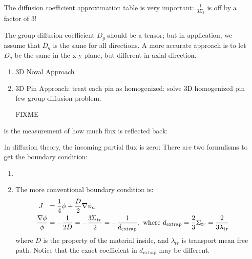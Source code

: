 \documentclass{school-22.211-notes}
\date{March 21, 2012}
\begin{document}
\maketitle

\clearpage
{}

The diffusion coefficient approximation table is very important: $\frac{1}{3\Sigma_t}$ is off by a factor of 3! 



The group diffusion coefficient $D_g$ should be a tensor; but in application, we assume that $D_g$ is the same for all directions. A more accurate approach is to let $D_g$ be the same in the x-y plane, but different in axial direction. 




\clearpage
{}
\begin{enumerate}
\item 3D Noval Approach
\item 3D Pin Approach: treat each pin as homogenized; solve 3D homogenized pin few-group diffusion problem. 
\item [FIXME]
\end{enumerate}





 is the measurement of how much flux is reflected back: 


In diffusion theory, the incoming partial flux is zero:
There are two formulisms to get the boundary condition: 
\begin{enumerate}
\item 
{}
\item The more conventional boundary condition is: 
\begin{align}
  J^- &= \frac{1}{4} \phi + \frac{D}{2} \nabla \phi_n \\
  \frac{\nabla \phi}{\phi} &= - \frac{1}{2D} = - \frac{3\Sigma_{tr}}{2} = - \frac{1}{d_{\mathrm{extrap}}}, \mbox{ where } d_{\mathrm{extrap}} = \frac{2}{3} \Sigma_{tr}  = \frac{2}{3 \lambda_{\mathrm{tr}}} 
\end{align}
where $D$ is the property of the material inside, and $\lambda_{tr}$ is transport mean free path. Notice that the exact coefficient in $d_{\mathrm{extrap}}$ may be different. 
\end{enumerate}
\end{document}
